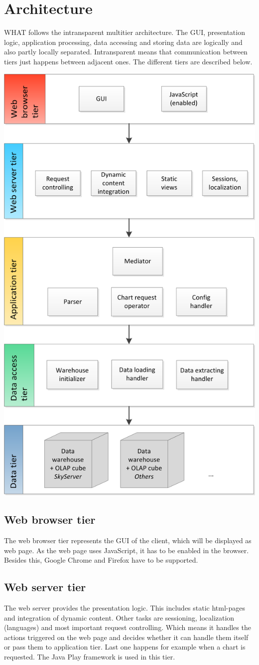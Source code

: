 \section{Architecture}

WHAT follows the intransparent multitier architecture. 
The GUI, presentation logic, application processing, data accessing and storing data
are logically and also partly locally separated. Intransparent means that communication
between tiers just happens between adjacent ones. The different tiers are described below.


\begin{center}
\includegraphics[width=0.6\linewidth]{Pictures/TierArchi.png} 
\end{center}   


\subsection{Web browser tier}
The web browser tier represents the GUI of the client, which will be displayed as web page.
As the web page uses JavaScript, it has to be enabled in the browser. 
Besides this, Google Chrome and Firefox have to be supported. 


\subsection{Web server tier}
The web server provides the presentation logic. This includes static html-pages and integration of dynamic
content. Other tasks are sessioning, localization (languages) and most important request controlling. 
Which means it handles the actions triggered on the web page and decides whether it can handle them itself 
or pass them to application tier. Last one happens for example when a chart is requested. 
The Java Play framework is used in this tier.


